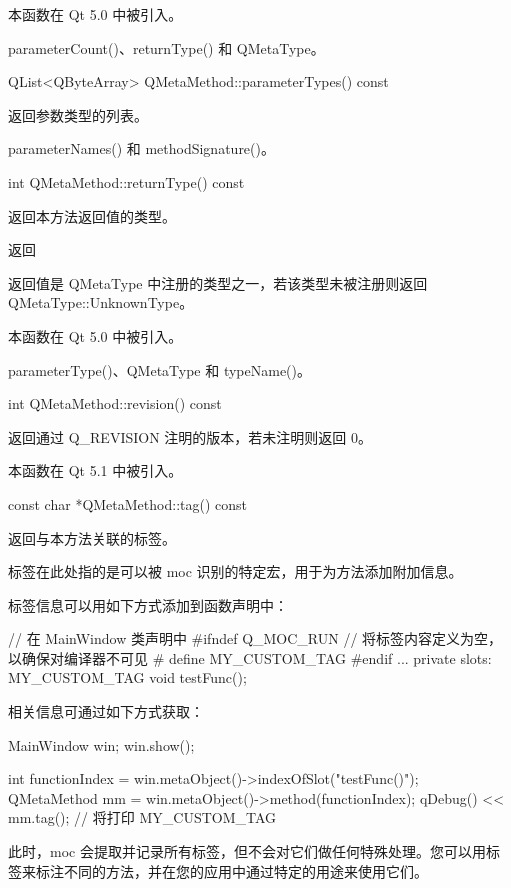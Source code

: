 本函数在 Qt 5.0 中被引入。

\begin{seeAlso}
parameterCount()、returnType() 和 QMetaType。
\end{seeAlso}

QList<QByteArray> QMetaMethod::parameterTypes() const

返回参数类型的列表。

\begin{seeAlso}
parameterNames() 和 methodSignature()。
\end{seeAlso}

int QMetaMethod::returnType() const

返回本方法返回值的类型。

返回

返回值是 QMetaType 中注册的类型之一，若该类型未被注册则返回 QMetaType::UnknownType。

本函数在 Qt 5.0 中被引入。

\begin{seeAlso}
parameterType()、QMetaType 和 typeName()。
\end{seeAlso}

int QMetaMethod::revision() const

返回通过 Q\_REVISION 注明的版本，若未注明则返回 0。

本函数在 Qt 5.1 中被引入。

const char *QMetaMethod::tag() const

返回与本方法关联的标签。

标签在此处指的是可以被 moc 识别的特定宏，用于为方法添加附加信息。

标签信息可以用如下方式添加到函数声明中：

\begin{cppcode}
// 在 MainWindow 类声明中
#ifndef Q_MOC_RUN
// 将标签内容定义为空，以确保对编译器不可见
#  define MY_CUSTOM_TAG
#endif
...
private slots:
	MY_CUSTOM_TAG void testFunc();
\end{cppcode}

相关信息可通过如下方式获取：

\begin{cppcode}
MainWindow win;
win.show();

int functionIndex = win.metaObject()->indexOfSlot("testFunc()");
QMetaMethod mm = win.metaObject()->method(functionIndex);
qDebug() << mm.tag(); // 将打印 MY_CUSTOM_TAG
\end{cppcode}


此时，moc 会提取并记录所有标签，但不会对它们做任何特殊处理。您可以用标签来标注不同的方法，并在您的应用中通过特定的用途来使用它们。

